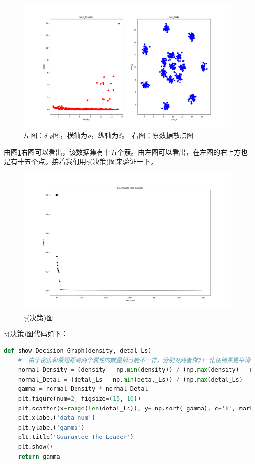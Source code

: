 \begin{figure}[ht]
\centering
\includegraphics[scale=0.45]{figure/1_1.png}%
\caption{左图：$\delta$-$\rho$图，横轴为$\rho$，纵轴为$\delta$。\ 右图：原数据散点图}
\label{figure1_1}
\end{figure}

由图\ref{figure1_1}右图可以看出，该数据集有十五个蔟。由左图可以看出，在左图的右上方也是有十五个点。接着我们用$\gamma$(决策)图来验证一下。


\begin{figure}[ht]
\centering
\includegraphics[scale=0.45]{figure/1_2.png}%
\caption{$\gamma$(决策)图}
\label{figure1_2}
\end{figure}

$\gamma$(决策)图代码如下：
\begin{lstlisting}[language=python]
def show_Decision_Graph(density, detal_Ls):
    #  由于密度和最短距离两个属性的数量级可能不一样，分别对两者做归一化使结果更平滑
    normal_Density = (density - np.min(density)) / (np.max(density) - np.min(density))
    normal_Detal = (detal_Ls - np.min(detal_Ls)) / (np.max(detal_Ls) - np.min(detal_Ls))
    gamma = normal_Density * normal_Detal
    plt.figure(num=2, figsize=(15, 10))
    plt.scatter(x=range(len(detal_Ls)), y=-np.sort(-gamma), c='k', marker='o', s=-np.sort(-gamma) * 100)
    plt.xlabel('data_num')
    plt.ylabel('gamma')
    plt.title('Guarantee The Leader')
    plt.show()
    return gamma
\end{lstlisting}



